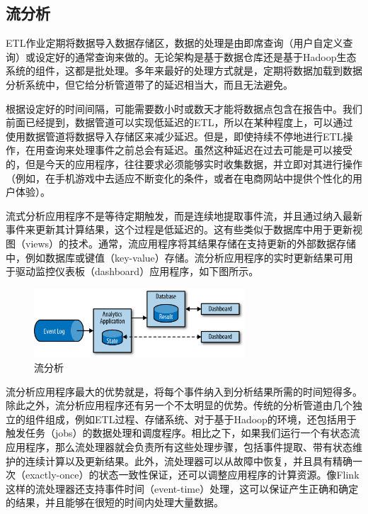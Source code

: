 \documentclass[cn,11pt,chinese]{elegantbook}
\begin{document}
\subsection{流分析}

ETL作业定期将数据导入数据存储区，数据的处理是由即席查询（用户自定义查询）或设定好的通常查询来做的。无论架构是基于数据仓库还是基于Hadoop生态系统的组件，这都是批处理。多年来最好的处理方式就是，定期将数据加载到数据分析系统中，但它给分析管道带了的延迟相当大，而且无法避免。

根据设定好的时间间隔，可能需要数小时或数天才能将数据点包含在报告中。我们前面已经提到，数据管道可以实现低延迟的ETL，所以在某种程度上，可以通过使用数据管道将数据导入存储区来减少延迟。但是，即使持续不停地进行ETL操作，在用查询来处理事件之前总会有延迟。虽然这种延迟在过去可能是可以接受的，但是今天的应用程序，往往要求必须能够实时收集数据，并立即对其进行操作（例如，在手机游戏中去适应不断变化的条件，或者在电商网站中提供个性化的用户体验）。

流式分析应用程序不是等待定期触发，而是连续地提取事件流，并且通过纳入最新事件来更新其计算结果，这个过程是低延迟的。这有些类似于数据库中用于更新视图（views）的技术。通常，流应用程序将其结果存储在支持更新的外部数据存储中，例如数据库或键值（key-value）存储。流分析应用程序的实时更新结果可用于驱动监控仪表板（dashboard）应用程序，如下图所示。

\begin{figure}[htbp]
  \centering
  \includegraphics[width=0.7\textwidth]{images/spaf_0106.png}
  \caption{流分析}
\end{figure}

流分析应用程序最大的优势就是，将每个事件纳入到分析结果所需的时间短得多。除此之外，流分析应用程序还有另一个不太明显的优势。传统的分析管道由几个独立的组件组成，例如ETL过程、存储系统、对于基于Hadoop的环境，还包括用于触发任务（jobs）的数据处理和调度程序。相比之下，如果我们运行一个有状态流应用程序，那么流处理器就会负责所有这些处理步骤，包括事件提取、带有状态维护的连续计算以及更新结果。此外，流处理器可以从故障中恢复，并且具有精确一次（exactly-once）的状态一致性保证，还可以调整应用程序的计算资源。像Flink这样的流处理器还支持事件时间（event-time）处理，这可以保证产生正确和确定的结果，并且能够在很短的时间内处理大量数据。
\end{document}
